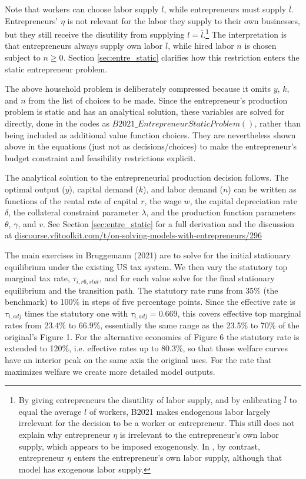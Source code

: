 \documentclass[11pt,fleqn]{article}
\begin{document}
Note that workers can choose labor supply $l$, while entrepreneurs must supply $\bar{l}$. Entrepreneurs' $\eta$ is not relevant for the labor they supply to their own businesses, but they still receive the disutility from supplying $l=\bar{l}$.\footnote{By giving entrepreneurs the disutility of labor supply, and by calibrating $\bar{l}$ to equal the average $l$ of workers, B2021 makes endogenous labor largely irrelevant for the decision to be a worker or entrepreneur. This still does not explain why entrepreneur $\eta$ is irrelevant to the entrepreneur's own labor supply, which appears to be imposed exogenously. In \citet{Kitao2008}, by contrast, entrepreneur $\eta$ enters the entrepreneur's own labor supply, although that model has exogenous labor supply.}
The interpretation is that entrepreneurs always supply own labor $\bar{l}$, while hired labor $n$ is chosen subject to $n \geq 0$. Section \ref{sec:entre_static} clarifies how this restriction enters the static entrepreneur problem.

The above household problem is deliberately compressed because it omits $y$, $k$, and $n$ from the list of choices to be made. Since the entrepreneur's production problem is static and has an analytical solution, these variables are solved for directly, done in the codes as $B2021\_EntrepreneurStaticProblem()$, rather than being included as additional value function choices. They are nevertheless shown above in the equations (just not as decisions/choices) to make the entrepreneur's budget constraint and feasibility restrictions explicit.

The analytical solution to the entrepreneurial production decision follows. The optimal output ($y$), capital demand ($k$), and labor demand ($n$) can be written as functions of the rental rate of capital $r$, the wage $w$, the capital depreciation rate $\delta$, the collateral constraint parameter $\lambda$, and the production function parameters $\theta$, $\gamma$, and $v$. See Section \ref{sec:entre_static} for a full derivation and the discussion at
\href{http://discourse.vfitoolkit.com/t/on-solving-models-with-entrepreneurs/296}{discourse.vfitoolkit.com/t/on-solving-models-with-entrepreneurs/296}

The main exercises in Bruggemann (2021) are to solve for the initial stationary equilibrium under the existing US tax system. We then vary the statutory top marginal tax rate, $\tau_{i,r6,stat}$, and for each value solve for the final stationary equilibrium and the transition path. The statutory rate runs from 35\% (the benchmark) to 100\% in steps of five percentage points. Since the effective rate is $\tau_{i,adj}$ times the statutory one with $\tau_{i,adj}=0.669$, this covers effective top marginal rates from 23.4\% to 66.9\%, essentially the same range as the 23.5\% to 70\% of the original's Figure 1. For the alternative economies of Figure 6 the statutory rate is extended to 120\%, i.e. effective rates up to 80.3\%, so that those welfare curves have an interior peak on the same axis the original uses. For the rate that maximizes welfare we create more detailed model outputs.
\end{document}
